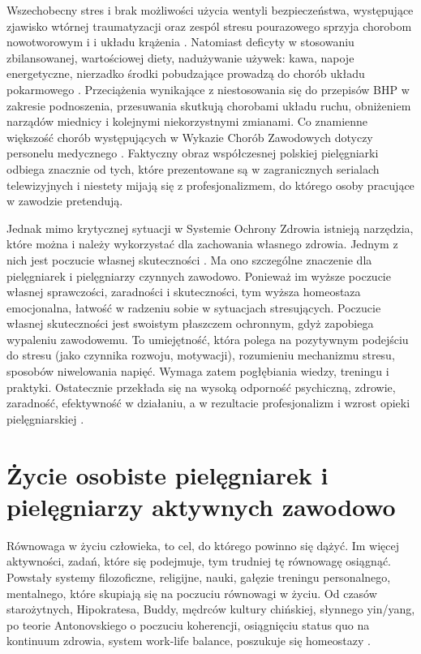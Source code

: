 \documentclass[a4paper,12pt,twoside,openright]{mwrep}
\begin{document}
Wszechobecny stres i brak możliwości użycia wentyli bezpieczeństwa, występujące zjawisko wtórnej traumatyzacji oraz zespól stresu pourazowego sprzyja chorobom nowotworowym i i układu krążenia \cite{skutki}. Natomiast deficyty w stosowaniu zbilansowanej, wartościowej diety, nadużywanie używek: kawa, napoje energetyczne, nierzadko środki pobudzające prowadzą do chorób układu pokarmowego \cite{p.p}. Przeciążenia wynikające z niestosowania się do przepisów BHP w zakresie podnoszenia, przesuwania skutkują chorobami układu ruchu, obniżeniem narządów miednicy i kolejnymi niekorzystnymi zmianami. Co znamienne większość chorób występujących w Wykazie Chorób Zawodowych dotyczy personelu medycznego \cite{wykaz}. Faktyczny obraz współczesnej polskiej pielęgniarki odbiega znacznie od tych, które prezentowane są w zagranicznych serialach telewizyjnych i niestety mijają się z profesjonalizmem, do którego osoby pracujące w zawodzie pretendują.

Jednak mimo krytycznej sytuacji w Systemie Ochrony Zdrowia istnieją narzędzia, które można i należy wykorzystać dla zachowania własnego zdrowia. Jednym z nich jest poczucie własnej skuteczności \cite{skutecznosc}. Ma ono szczególne znaczenie dla pielęgniarek i pielęgniarzy czynnych zawodowo. Ponieważ im wyższe poczucie własnej sprawczości, zaradności i skuteczności, tym wyższa homeostaza emocjonalna, łatwość w radzeniu sobie w sytuacjach stresujących\cite{salutogeneza}. Poczucie własnej skuteczności jest swoistym płaszczem ochronnym, gdyż zapobiega wypaleniu zawodowemu. To umiejętność, która polega na pozytywnym podejściu do stresu (jako czynnika rozwoju, motywacji), rozumieniu mechanizmu stresu, sposobów niwelowania napięć. Wymaga zatem pogłębiania wiedzy, treningu i praktyki. Ostatecznie przekłada się na wysoką odporność psychiczną, zdrowie, zaradność, efektywność w działaniu, a w rezultacie profesjonalizm i wzrost opieki pielęgniarskiej \cite{stres}.

\section{Życie osobiste pielęgniarek i pielęgniarzy \newline aktywnych zawodowo}
\label{sectionZycieOsobiste}
Równowaga w życiu człowieka, to cel, do którego powinno się dążyć. Im więcej aktywności, zadań, które się podejmuje, tym trudniej tę równowagę osiągnąć. Powstały systemy filozoficzne, religijne, nauki, gałęzie treningu personalnego, mentalnego, które skupiają się na poczuciu równowagi w życiu. Od czasów starożytnych, Hipokratesa, Buddy, mędrców kultury chińskiej, słynnego yin/yang, po teorie Antonovskiego o poczuciu koherencji, osiągnięciu status quo na kontinuum zdrowia, system work-life balance, poszukuje się homeostazy \cite{salutogeneza}.
\end{document}
